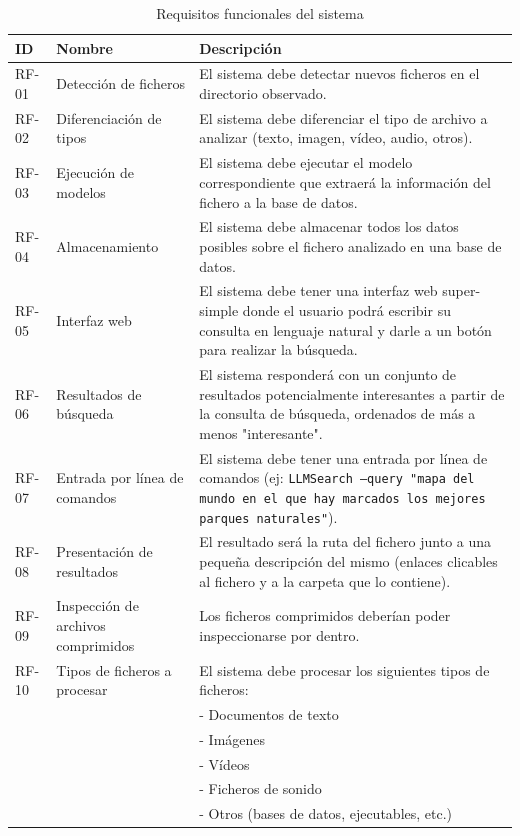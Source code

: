 \begin{table}[H]
\centering
\begin{tabular}{|p{1cm}|p{4cm}|p{9cm}|}
\hline
\textbf{ID} & \textbf{Nombre} & \textbf{Descripción} \\
\hline
RF-01 & Detección de ficheros & El sistema debe detectar nuevos ficheros en el directorio observado. \\
\hline
RF-02 & Diferenciación de tipos & El sistema debe diferenciar el tipo de archivo a analizar (texto, imagen, vídeo, audio, otros). \\
\hline
RF-03 & Ejecución de modelos & El sistema debe ejecutar el modelo correspondiente que extraerá la información del fichero a la base de datos. \\
\hline
RF-04 & Almacenamiento & El sistema debe almacenar todos los datos posibles sobre el fichero analizado en una base de datos. \\
\hline
RF-05 & Interfaz web & El sistema debe tener una interfaz web super-simple donde el usuario podrá escribir su consulta en lenguaje natural y darle a un botón para realizar la búsqueda. \\
\hline
RF-06 & Resultados de búsqueda & El sistema responderá con un conjunto de resultados potencialmente interesantes a partir de la consulta de búsqueda, ordenados de más a menos "interesante". \\
\hline
RF-07 & Entrada por línea de comandos & El sistema debe tener una entrada por línea de comandos (ej: \texttt{LLMSearch --query "mapa del mundo en el que hay marcados los mejores parques naturales"}). \\
\hline
RF-08 & Presentación de resultados & El resultado será la ruta del fichero junto a una pequeña descripción del mismo (enlaces clicables al fichero y a la carpeta que lo contiene). \\
\hline
RF-09 & Inspección de archivos comprimidos & Los ficheros comprimidos deberían poder inspeccionarse por dentro. \\
\hline
RF-10 & Tipos de ficheros a procesar & El sistema debe procesar los siguientes tipos de ficheros: \\
& & - Documentos de texto \\
& & - Imágenes \\
& & - Vídeos \\
& & - Ficheros de sonido \\
& & - Otros (bases de datos, ejecutables, etc.) \\
\hline
\end{tabular}
\caption{Requisitos funcionales del sistema}
\label{tab:req_funcionales}
\end{table}

